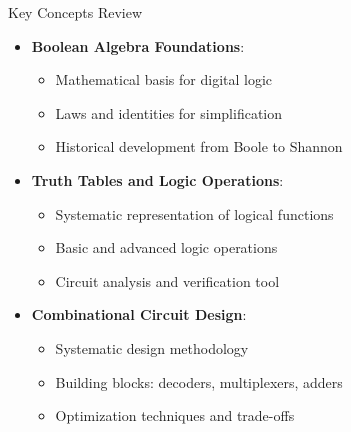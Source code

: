 \documentclass[aspectratio=169,11pt]{beamer}
\newcommand{\concept}[1]{\textbf{\color{accentcolor}#1}}
\begin{document}
\begin{frame}{Key Concepts Review}
\begin{itemize}
\item \concept{Boolean Algebra Foundations}:
\begin{itemize}
\item Mathematical basis for digital logic
\item Laws and identities for simplification
\item Historical development from Boole to Shannon
\end{itemize}
\vspace{0.3cm}
\item \concept{Truth Tables and Logic Operations}:
\begin{itemize}
\item Systematic representation of logical functions
\item Basic and advanced logic operations
\item Circuit analysis and verification tool
\end{itemize}
\vspace{0.3cm}
\item \concept{Combinational Circuit Design}:
\begin{itemize}
\item Systematic design methodology
\item Building blocks: decoders, multiplexers, adders
\item Optimization techniques and trade-offs
\end{itemize}
\end{itemize}
\end{frame}
\end{document}
